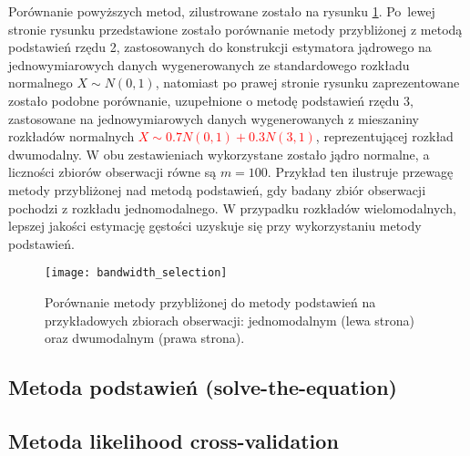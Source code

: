 \begin{exmp}
Porównanie powyższych metod, zilustrowane zostało na rysunku \ref{fig:bandwidth_selection}. Po~lewej stronie rysunku przedstawione zostało porównanie metody przybliżonej z metodą podstawień rzędu 2, zastosowanych do konstrukcji estymatora jądrowego na jednowymiarowych danych wygenerowanych ze standardowego rozkładu normalnego $X \sim N(0,1)$, natomiast po prawej stronie rysunku zaprezentowane zostało podobne porównanie, uzupełnione o metodę podstawień rzędu 3, zastosowane na jednowymiarowych danych wygenerowanych z mieszaniny rozkładów normalnych \textcolor{red}{$X \sim 0.7 N(0,1) + 0.3 N(3,1)$}, reprezentującej rozkład dwumodalny. W obu zestawieniach wykorzystane zostało jądro normalne, a liczności zbiorów obserwacji równe są $m=100$. Przykład ten ilustruje przewagę metody przybliżonej nad metodą podstawień, gdy badany zbiór obserwacji pochodzi z rozkładu jednomodalnego. W przypadku rozkładów wielomodalnych, lepszej jakości estymację gęstości uzyskuje się przy wykorzystaniu metody podstawień.

\begin{figure}[H]
    \centering
    \texttt{[image: bandwidth\_selection]}
    \vspace{-0.5cm} 
    \caption{Porównanie metody przybliżonej do metody podstawień na przykładowych zbiorach obserwacji: jednomodalnym (lewa strona) oraz dwumodalnym (prawa strona).}
    \label{fig:bandwidth_selection}
\end{figure}
\end{exmp}

\subsection*{Metoda podstawień (solve-the-equation)}

\subsection*{Metoda likelihood cross-validation}

